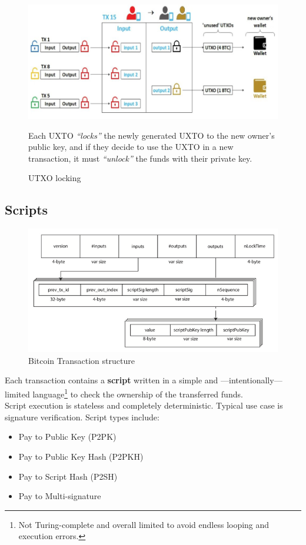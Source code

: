 \begin{figure}[htbp]
   \centering
   \includegraphics{images/bitcoin_UTXO.png}
   \caption{UTXO locking}

   Each UXTO \textit{``locks''} the newly generated UXTO to the new owner's public key, and if they decide to use the UXTO in a new transaction, it must \textit{``unlock''} the funds with their private key.
   \label{fig:bitcoin_UTXO}
\end{figure}

\subsection{Scripts}
\begin{figure}[htbp]
   \centering
   \includegraphics{images/bitcoin_transactionStructure.png}
   \caption{Bitcoin Transaction structure}
   \label{fig:bitcoin_transactionStructure}
\end{figure}

Each transaction contains a \textbf{script} written in a simple and ---intentionally--- limited language\footnote{Not Turing-complete and overall limited to avoid endless looping and execution errors.} to check the ownership of the transferred funds.\\
Script execution is stateless and completely deterministic.
Typical use case is signature verification.
Script types include:
\begin{itemize}
   \item Pay to Public Key (P2PK)
   \item Pay to Public Key Hash (P2PKH)
   \item Pay to Script Hash (P2SH)
   \item Pay to Multi-signature
\end{itemize}

